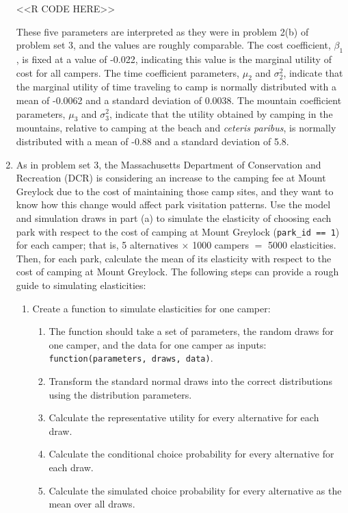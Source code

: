 \documentclass[11pt,letterpaper]{article}
\begin{document}
\begin{enumerate}[label=\alph*., leftmargin=*]
	<<R CODE HERE>>

	These five parameters are interpreted as they were in problem 2(b) of problem set 3, and the values are roughly comparable. The cost coefficient, $\beta_1$, is fixed at a value of -0.022, indicating this value is the marginal utility of cost for all campers. The time coefficient parameters, $\mu_2$ and $\sigma_2^2$, indicate that the marginal utility of time traveling to camp is normally distributed with a mean of -0.0062 and a standard deviation of 0.0038. The mountain coefficient parameters, $\mu_3$ and $\sigma_3^2$, indicate that the utility obtained by camping in the mountains, relative to camping at the beach and \emph{ceteris paribus}, is normally distributed with a mean of -0.88 and a standard deviation of 5.8.

	\item As in problem set 3, the Massachusetts Department of Conservation and Recreation (DCR) is considering an increase to the camping fee at Mount Greylock due to the cost of maintaining those camp sites, and they want to know how this change would affect park visitation patterns. Use the model and simulation draws in part (a) to simulate the elasticity of choosing each park with respect to the cost of camping at Mount Greylock (\texttt{park\_id == 1}) for each camper; that is, 5 alternatives $\times$ 1000 campers $=$ 5000 elasticities. Then, for each park, calculate the mean of its elasticity with respect to the cost of camping at Mount Greylock. The following steps can provide a rough guide to simulating elasticities:
	\begin{enumerate}[label=\Roman*.]
		\item Create a function to simulate elasticities for one camper:
		\begin{enumerate}[label=\roman*.]
			\item The function should take a set of parameters, the random draws for one camper, and the data for one camper as inputs: \texttt{function(parameters, draws, data)}.
			\item Transform the standard normal draws into the correct distributions using the distribution parameters.
			\item Calculate the representative utility for every alternative for each draw.
			\item Calculate the conditional choice probability for every alternative for each draw.
			\item Calculate the simulated choice probability for every alternative as the mean over all draws.

\end{enumerate}
\end{enumerate}
\end{enumerate}
\end{document}
